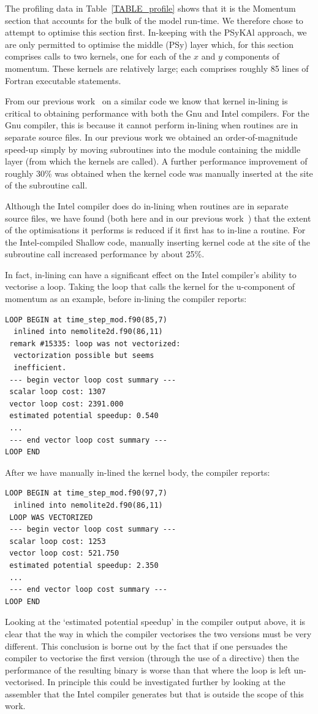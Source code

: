 \documentclass[gmdd, manuscript]{copernicus}
\begin{document}
The profiling data in Table~\ref{TABLE_profile} shows that it is the
Momentum section that accounts for the bulk of the model run-time.  We
therefore chose to attempt to optimise this section first. In-keeping
with the {PS}y{KA}l approach, we are only permitted to optimise the middle
(PSy) layer which, for this section comprises calls to two kernels,
one for each of the $x$ and $y$ components of momentum. These kernels
are relatively large; each comprises roughly 85 lines of Fortran
executable statements.

From our previous work~\citep{shallow_psykal} on a similar code we know
that kernel in-lining is critical to obtaining performance with both
the Gnu and Intel compilers. For the Gnu compiler, this is because it
cannot perform in-lining when routines are in separate source
files. In our previous work we obtained an order-of-magnitude speed-up
simply by moving subroutines into the module containing the middle
layer (from which the kernels are called). A further performance
improvement of roughly 30\% was obtained when the kernel code was
manually inserted at the site of the subroutine call.

Although the Intel compiler does do in-lining when routines are in
separate source files, we have found (both here and in our previous
work~\citep{shallow_psykal}) that the extent of the optimisations it
performs is reduced if it first has to in-line a routine. For the
Intel-compiled Shallow code, manually inserting kernel code at the
site of the subroutine call increased performance by about 25\%.

In fact, in-lining can have a significant effect on the Intel
compiler's ability to vectorise a loop. Taking the loop that calls the
kernel for the u-component of momentum as an example, before in-lining
the compiler reports:
\begin{verbatim}
LOOP BEGIN at time_step_mod.f90(85,7) 
  inlined into nemolite2d.f90(86,11)
 remark #15335: loop was not vectorized: 
  vectorization possible but seems 
  inefficient. 
 --- begin vector loop cost summary ---
 scalar loop cost: 1307 
 vector loop cost: 2391.000 
 estimated potential speedup: 0.540 
 ...
 --- end vector loop cost summary ---
LOOP END
\end{verbatim}
After we have manually in-lined the kernel body, the compiler reports:
\begin{verbatim}
LOOP BEGIN at time_step_mod.f90(97,7) 
  inlined into nemolite2d.f90(86,11)
 LOOP WAS VECTORIZED
 --- begin vector loop cost summary ---
 scalar loop cost: 1253 
 vector loop cost: 521.750 
 estimated potential speedup: 2.350 
 ...
 --- end vector loop cost summary ---
LOOP END
\end{verbatim}
Looking at the `estimated potential speedup' in the compiler output
above, it is clear that the way in which the compiler vectorises the
two versions must be very different. This conclusion is borne out by
the fact that if one persuades the compiler to vectorise the first
version (through the use of a directive) then the performance of the
resulting binary is worse than that where the loop is left
un-vectorised. In principle this could be investigated further by
looking at the assembler that the Intel compiler generates but that is
outside the scope of this work.
\end{document}
